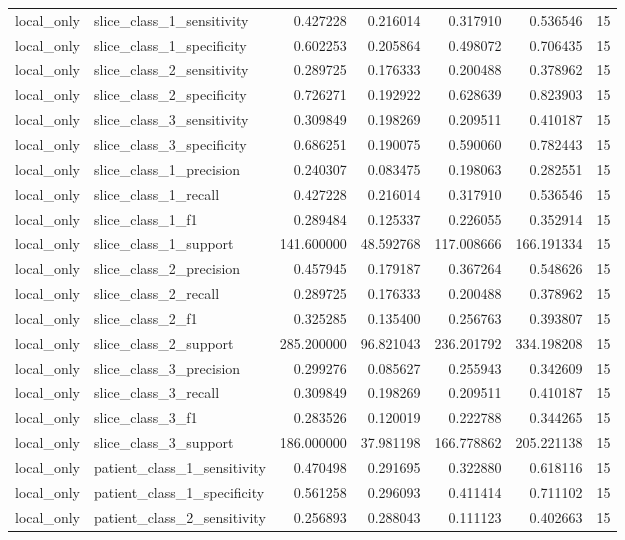 \begin{tabular}{llrrrrr}
local_only & slice_class_1_sensitivity & 0.427228 & 0.216014 & 0.317910 & 0.536546 & 15 \\
local_only & slice_class_1_specificity & 0.602253 & 0.205864 & 0.498072 & 0.706435 & 15 \\
local_only & slice_class_2_sensitivity & 0.289725 & 0.176333 & 0.200488 & 0.378962 & 15 \\
local_only & slice_class_2_specificity & 0.726271 & 0.192922 & 0.628639 & 0.823903 & 15 \\
local_only & slice_class_3_sensitivity & 0.309849 & 0.198269 & 0.209511 & 0.410187 & 15 \\
local_only & slice_class_3_specificity & 0.686251 & 0.190075 & 0.590060 & 0.782443 & 15 \\
local_only & slice_class_1_precision & 0.240307 & 0.083475 & 0.198063 & 0.282551 & 15 \\
local_only & slice_class_1_recall & 0.427228 & 0.216014 & 0.317910 & 0.536546 & 15 \\
local_only & slice_class_1_f1 & 0.289484 & 0.125337 & 0.226055 & 0.352914 & 15 \\
local_only & slice_class_1_support & 141.600000 & 48.592768 & 117.008666 & 166.191334 & 15 \\
local_only & slice_class_2_precision & 0.457945 & 0.179187 & 0.367264 & 0.548626 & 15 \\
local_only & slice_class_2_recall & 0.289725 & 0.176333 & 0.200488 & 0.378962 & 15 \\
local_only & slice_class_2_f1 & 0.325285 & 0.135400 & 0.256763 & 0.393807 & 15 \\
local_only & slice_class_2_support & 285.200000 & 96.821043 & 236.201792 & 334.198208 & 15 \\
local_only & slice_class_3_precision & 0.299276 & 0.085627 & 0.255943 & 0.342609 & 15 \\
local_only & slice_class_3_recall & 0.309849 & 0.198269 & 0.209511 & 0.410187 & 15 \\
local_only & slice_class_3_f1 & 0.283526 & 0.120019 & 0.222788 & 0.344265 & 15 \\
local_only & slice_class_3_support & 186.000000 & 37.981198 & 166.778862 & 205.221138 & 15 \\
local_only & patient_class_1_sensitivity & 0.470498 & 0.291695 & 0.322880 & 0.618116 & 15 \\
local_only & patient_class_1_specificity & 0.561258 & 0.296093 & 0.411414 & 0.711102 & 15 \\
local_only & patient_class_2_sensitivity & 0.256893 & 0.288043 & 0.111123 & 0.402663 & 15 \\

\end{tabular}
